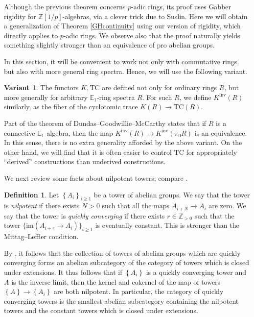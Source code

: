 \documentclass{amsart}
\newcommand{\knf}{K^{\mathrm{inv}}}
\theoremstyle{definition}
\newtheorem{definition}{Definition}[section]
\newtheorem*{var}{Variant}
\newcommand{\TC}{\mathrm{TC}}
\begin{document}
Although the previous theorem concerns $p$-adic rings, its proof uses Gabber rigidity for $\mathbb{Z}[1/p]$-algebras, via a clever trick due to Suslin.  Here we will obtain a generalization of Theorem \ref{GHcontinuity} using our version of rigidity, which directly applies to $p$-adic rings.  We observe also that the proof naturally yields something slightly
stronger than an equivalence of pro abelian groups. 

In this section, it will be convenient to work not only with commutative
rings, but also with more general ring spectra.  Hence, we will use the following variant. 

\begin{var}
The functors $K, \TC$ are defined not only for ordinary rings $R$, but more
generally for arbitrary $\mathbb{E}_1$-ring spectra $R$. For such $R$, we define
$\knf(R)$ similarly, as the fiber of the cyclotomic trace $K(R) \to \TC(R)$. 
\end{var}


Part of the theorem of Dundas--Goodwillie--McCarthy \cite{dgm} states that if $R$
is a connective $\mathbb{E}_1$-algebra, then the map $\knf(R) \to \knf(\pi_0 R)$
is an equivalence. 
In this sense, there is no extra generality afforded by the above variant. On
the other hand, we will find that it is often easier to control $\TC$ for appropriately
``derived'' constructions than underived constructions.



We next review some facts about nilpotent towers; compare \cite{Mthick}. 

\begin{definition} 
Let $\left\{A_i\right\}_{i \geq 1}$ be a tower of abelian groups. We say that
the tower is \emph{nilpotent} if there exists $N> 0$ such that all the maps
$A_{i+N} \to A_i$ are zero. We say that
the tower is \emph{quickly converging} if there exists $r \in \mathbb{Z}_{>0}$ such
that the tower $\{\mathrm{im}(A_{i+r} \to A_i)\}_{i\ge1}$ is eventually constant. 
This is stronger than the Mittag--Leffler condition. 
\label{quickconvab}
\end{definition} 


By \cite[Lemma 3.10]{Mthick}, it follows that the collection of towers of
abelian groups which are quickly converging forms an abelian subcategory of the
category of towers which is closed under extensions. 
It thus follows that if $\left\{A_i\right\}$ is a quickly converging tower and
$A$ is the inverse limit, then the kernel and cokernel of the map of towers
$\left\{A\right\} \to \left\{A_i\right\}$ are both nilpotent. 
In particular, the category of quickly converging towers is the smallest abelian 
subcategory containing the nilpotent towers and the constant towers which is
closed under extensions. 
\end{document}
